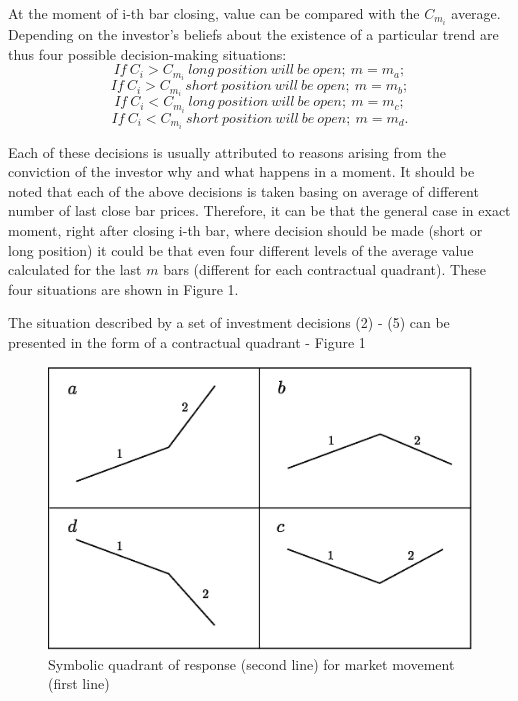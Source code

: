 \documentclass{tewiart}
\begin{document}
At the moment of i-th bar closing, value can be compared with the $C_{m_{i}}$ average. Depending on the investor's beliefs about the existence of a particular trend are thus four possible decision-making situations:
\begin{equation} If\ C_i  > C_{m_{i}}\   long\ position\ will\ be\ open;\ m=m_a; \end{equation}
\begin{equation} If\ C_i  > C_{m_{i}}\   short\ position\ will\ be\ open;\ m=m_b; \end{equation}
\begin{equation} If\ C_i  < C_{m_{i}}\   long\ position\ will\ be\ open;\ m=m_c; \end{equation}
\begin{equation} If\ C_i  < C_{m_{i}}\   short\ position\ will\ be\ open;\ m=m_d. \end{equation}

Each of these decisions is usually attributed to reasons arising from the conviction of the investor why and what happens in a moment. It should be noted that each of the above decisions is taken basing on average of different number of last close bar prices. Therefore, it can be that the general case in exact moment, right after closing i-th bar, where decision should be made (short or long position) it could be that even four different levels of  the average value calculated for the last $m$ bars (different for each contractual quadrant). These four situations are shown in Figure 1.

The situation described by a set of investment decisions (2) - (5) can be presented in the form of a contractual quadrant - Figure 1


\begin{figure}[h!]
 \centering
 \includegraphics[width=\textwidth]{Rysunek0_all2.eps}
 \caption{Symbolic quadrant of response (second line) for market movement (first line)}
\end{figure}
\FloatBarrier
\end{document}
